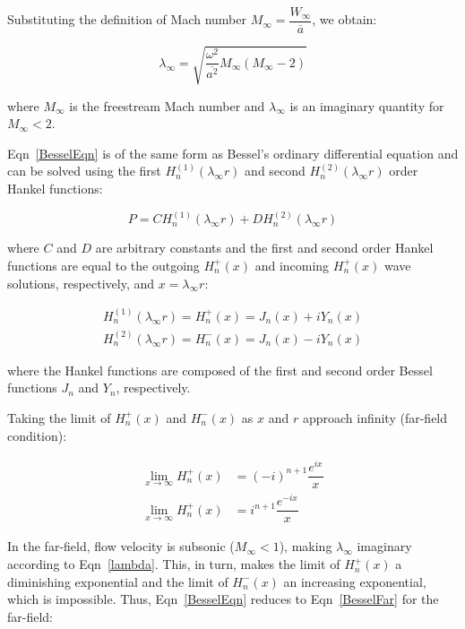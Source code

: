 \documentclass[]{aiaa-tc}%
\begin{document}
Substituting the definition of Mach number $M_{\infty} = \dfrac{W_{\infty}}{\overline{a}}$, we obtain:

\begin{equation} \label{lambda}
\lambda_{\infty} = \sqrt{ \dfrac{\omega^2}{\overline{a^2}} M_{\infty} ( M_{\infty} - 2 ) }
\end{equation}

\noindent where $M_{\infty}$ is the freestream Mach number and $\lambda_{\infty}$ is an imaginary quantity for $M_{\infty} < 2$.

Eqn~\ref{BesselEqn} is of the same form as Bessel's ordinary differential equation and can be solved using the first $H_n^{(1)}(\lambda_{\infty} r)$ and second $H_n^{(2)}(\lambda_{\infty} r)$ order Hankel functions:

\begin{equation}
P = C H_n^{(1)}(\lambda_{\infty} r) + D H_n^{(2)}(\lambda_{\infty} r)
\end{equation}

\noindent where $C$ and $D$ are arbitrary constants and the first and second order Hankel functions are equal to the outgoing $H_n^{+}(x)$ and incoming $H_n^{+}(x)$ wave solutions, respectively, and $x = \lambda_{\infty} r$:

\begin{align}
H_n^{(1)}(\lambda_{\infty} r) = H_n^{+}(x) = J_n(x) + i Y_n(x) \\
H_n^{(2)}(\lambda_{\infty} r) = H_n^{-}(x) = J_n(x) - i Y_n(x)
\end{align}

\noindent where the Hankel functions are composed of the first and second order Bessel functions $J_n$ and $Y_n$, respectively.

Taking the limit of $H_n^{+}(x)$ and $H_n^{-}(x)$ as $x$ and $r$ approach infinity (far-field condition):

\begin{align*}
\lim_{x\to\infty} H_n^{+}(x) &= (-i)^{n+1} \dfrac{e^{ix}}{x} \\
\lim_{x\to\infty} H_n^{+}(x) &= i^{n+1}    \dfrac{e^{-ix}}{x}
\end{align*}

In the far-field, flow velocity is subsonic ($M_{\infty}<1$), making $\lambda_{\infty}$ imaginary according to Eqn~\ref{lambda}.  This, in turn, makes the limit of $H_n^{+}(x)$ a diminishing exponential and the limit of $H_n^{-}(x)$ an increasing exponential, which is impossible.  Thus, Eqn~\ref{BesselEqn} reduces to Eqn~\ref{BesselFar} for the far-field:
\end{document}
